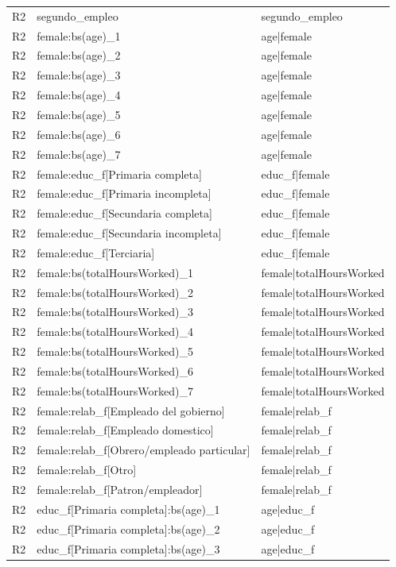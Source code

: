 \begin{longtable}{lll}
R2 & segundo\_empleo & segundo\_empleo \\
R2 & female:bs(age)\_1 & age|female \\
R2 & female:bs(age)\_2 & age|female \\
R2 & female:bs(age)\_3 & age|female \\
R2 & female:bs(age)\_4 & age|female \\
R2 & female:bs(age)\_5 & age|female \\
R2 & female:bs(age)\_6 & age|female \\
R2 & female:bs(age)\_7 & age|female \\
R2 & female:educ\_f[Primaria completa] & educ\_f|female \\
R2 & female:educ\_f[Primaria incompleta] & educ\_f|female \\
R2 & female:educ\_f[Secundaria completa] & educ\_f|female \\
R2 & female:educ\_f[Secundaria incompleta] & educ\_f|female \\
R2 & female:educ\_f[Terciaria] & educ\_f|female \\
R2 & female:bs(totalHoursWorked)\_1 & female|totalHoursWorked \\
R2 & female:bs(totalHoursWorked)\_2 & female|totalHoursWorked \\
R2 & female:bs(totalHoursWorked)\_3 & female|totalHoursWorked \\
R2 & female:bs(totalHoursWorked)\_4 & female|totalHoursWorked \\
R2 & female:bs(totalHoursWorked)\_5 & female|totalHoursWorked \\
R2 & female:bs(totalHoursWorked)\_6 & female|totalHoursWorked \\
R2 & female:bs(totalHoursWorked)\_7 & female|totalHoursWorked \\
R2 & female:relab\_f[Empleado del gobierno] & female|relab\_f \\
R2 & female:relab\_f[Empleado domestico] & female|relab\_f \\
R2 & female:relab\_f[Obrero/empleado particular] & female|relab\_f \\
R2 & female:relab\_f[Otro] & female|relab\_f \\
R2 & female:relab\_f[Patron/empleador] & female|relab\_f \\
R2 & educ\_f[Primaria completa]:bs(age)\_1 & age|educ\_f \\
R2 & educ\_f[Primaria completa]:bs(age)\_2 & age|educ\_f \\
R2 & educ\_f[Primaria completa]:bs(age)\_3 & age|educ\_f \\

\end{longtable}
